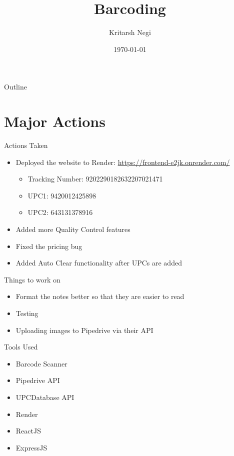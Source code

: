 \documentclass[aspectratio=1610]{beamer}
\title{Barcoding}
\author{Kritarsh Negi}
\institute{The CPAP Box}
\date{\today}
\begin{document}
\begin{frame}
    \titlepage
\end{frame}

\begin{frame}{Outline}
    \tableofcontents
\end{frame}

\section{Major Actions}
\begin{frame}{Actions Taken}
    \begin{itemize}
        \item Deployed the website to Render: \url{https://frontend-e2jk.onrender.com/}
        \begin{itemize}
            \item Tracking Number: 9202290182632207021471
            \item UPC1: 9420012425898
            \item UPC2: 643131378916
        \end{itemize}
        \item Added more Quality Control features
        \item Fixed the pricing bug
        \item Added Auto Clear functionality after UPCs are added
    \end{itemize}
\end{frame}
\begin{frame}{Things to work on }
    \begin{itemize}
        \item Format the notes better so that they are easier to read
        \item Testing
        \item Uploading images to Pipedrive via their API
    \end{itemize}
\end{frame}
\begin{frame}{Tools Used}
    \begin{itemize}
        \item Barcode Scanner
        \item Pipedrive API
        \item UPCDatabase API
        \item Render
        \item ReactJS
        \item ExpressJS
    \end{itemize}
\end{frame}
\end{document}
